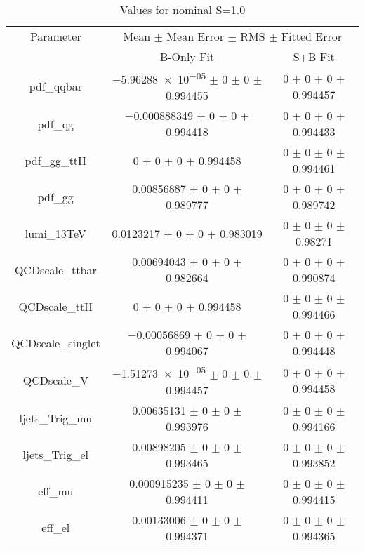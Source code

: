 \begin{table}
\centering
\caption{Values for nominal S=1.0}
\begin{tabular}{ccc}
\toprule
Parameter 	& \multicolumn{2}{c}{Mean $\pm$ Mean Error $\pm$ RMS $\pm$ Fitted Error}\\
 	& B-Only Fit & S+B Fit\\
\midrule
pdf\_qqbar 	& \num{-5.96288e-05} $\pm$ \num{0} $\pm$ \num{0} $\pm$ \num{0.994455} 	& \num{0} $\pm$ \num{0} $\pm$ \num{0} $\pm$ \num{0.994457}\\
pdf\_qg 	& \num{-0.000888349} $\pm$ \num{0} $\pm$ \num{0} $\pm$ \num{0.994418} 	& \num{0} $\pm$ \num{0} $\pm$ \num{0} $\pm$ \num{0.994433}\\
pdf\_gg\_ttH 	& \num{0} $\pm$ \num{0} $\pm$ \num{0} $\pm$ \num{0.994458} 	& \num{0} $\pm$ \num{0} $\pm$ \num{0} $\pm$ \num{0.994461}\\
pdf\_gg 	& \num{0.00856887} $\pm$ \num{0} $\pm$ \num{0} $\pm$ \num{0.989777} 	& \num{0} $\pm$ \num{0} $\pm$ \num{0} $\pm$ \num{0.989742}\\
lumi\_13TeV 	& \num{0.0123217} $\pm$ \num{0} $\pm$ \num{0} $\pm$ \num{0.983019} 	& \num{0} $\pm$ \num{0} $\pm$ \num{0} $\pm$ \num{0.98271}\\
QCDscale\_ttbar 	& \num{0.00694043} $\pm$ \num{0} $\pm$ \num{0} $\pm$ \num{0.982664} 	& \num{0} $\pm$ \num{0} $\pm$ \num{0} $\pm$ \num{0.990874}\\
QCDscale\_ttH 	& \num{0} $\pm$ \num{0} $\pm$ \num{0} $\pm$ \num{0.994458} 	& \num{0} $\pm$ \num{0} $\pm$ \num{0} $\pm$ \num{0.994466}\\
QCDscale\_singlet 	& \num{-0.00056869} $\pm$ \num{0} $\pm$ \num{0} $\pm$ \num{0.994067} 	& \num{0} $\pm$ \num{0} $\pm$ \num{0} $\pm$ \num{0.994448}\\
QCDscale\_V 	& \num{-1.51273e-05} $\pm$ \num{0} $\pm$ \num{0} $\pm$ \num{0.994457} 	& \num{0} $\pm$ \num{0} $\pm$ \num{0} $\pm$ \num{0.994458}\\
ljets\_Trig\_mu 	& \num{0.00635131} $\pm$ \num{0} $\pm$ \num{0} $\pm$ \num{0.993976} 	& \num{0} $\pm$ \num{0} $\pm$ \num{0} $\pm$ \num{0.994166}\\
ljets\_Trig\_el 	& \num{0.00898205} $\pm$ \num{0} $\pm$ \num{0} $\pm$ \num{0.993465} 	& \num{0} $\pm$ \num{0} $\pm$ \num{0} $\pm$ \num{0.993852}\\
eff\_mu 	& \num{0.000915235} $\pm$ \num{0} $\pm$ \num{0} $\pm$ \num{0.994411} 	& \num{0} $\pm$ \num{0} $\pm$ \num{0} $\pm$ \num{0.994415}\\
eff\_el 	& \num{0.00133006} $\pm$ \num{0} $\pm$ \num{0} $\pm$ \num{0.994371} 	& \num{0} $\pm$ \num{0} $\pm$ \num{0} $\pm$ \num{0.994365}\\

\end{tabular}
\end{table}

